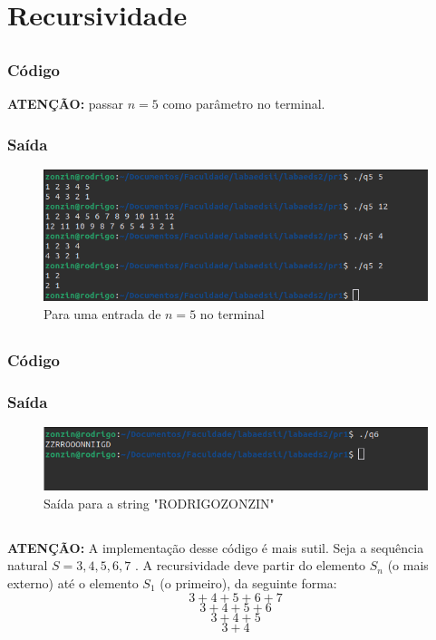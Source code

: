 \newpage
\section{Recursividade}

\subsection{}
\subsubsection*{Código}
\textbf{ATENÇÃO: } passar $n=5$ como parâmetro no terminal. 

\subsubsection*{Saída}
\begin{figure}[h!]
	\centering
	\includegraphics[width=0.7\linewidth]{imagens/saida_q5}
	\caption{Para uma entrada de $n = 5$ no terminal}
	\label{fig:saidaq5}
\end{figure}


\subsection{}
\subsubsection*{Código}

\subsubsection*{Saída}
\begin{figure}[h!]
	\centering
	\includegraphics[width=0.7\linewidth]{imagens/saida_q6}
	\caption{Saída para a string "RODRIGOZONZIN"}
	\label{fig:saidaq6}
\end{figure}

\newpage
\subsection{}
\textbf{ATENÇÃO:} A implementação desse código é mais sutil. Seja a sequência natural $S = 3, 4, 5, 6, 7$ . 
A recursividade deve partir do elemento $S_n$ (o mais externo) até o elemento $S_1$ (o primeiro), da seguinte forma: 
$$ 3 + 4 + 5 + 6 + 7 $$
$$ 3 + 4 + 5 + 6  $$
$$ 3 + 4 + 5  $$
$$ 3 + 4 $$

